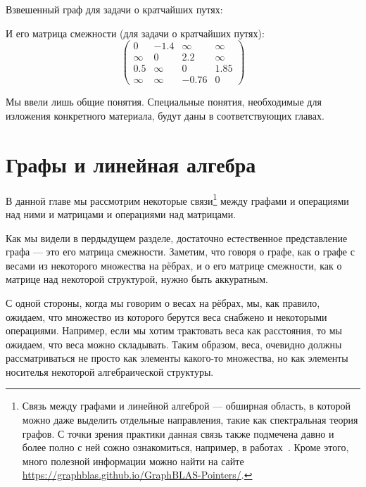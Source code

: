 \begin{example}\label{example:apspGraph}
  Взвешенный граф для задачи о кратчайших путях:
  \begin{center}
    
  \end{center}

  И его матрица смежности (для задачи о кратчайших путях):
  $$
  \begin{pmatrix}
    0 & -1.4 & \infty & \infty \\
    \infty & 0 & 2.2 & \infty \\
    0.5 & \infty & 0 & 1.85 \\
    \infty & \infty & -0.76 & 0
  \end{pmatrix}
  $$
\end{example}

Мы ввели лишь общие понятия.
Специальные понятия, необходимые для изложения конкретного материала, будут даны в соответствующих главах.

\section{Графы и линейная алгебра}

В данной главе мы рассмотрим некоторые связи\footnote{Связь между графами и линейной алгеброй --- обширная область, в которой можно даже выделить отдельные направления, такие как спектральная теория графов. С точки зрения практики данная связь также подмечена давно и более полно с ней сожно ознакомиться, например, в работах~\cite{doi:10.1137/1.9780898719918, Davis2018Algorithm9S}. Кроме этого, много полезной информации можно найти на сайте \url{https://graphblas.github.io/GraphBLAS-Pointers/}.} между графами и операциями над ними и матрицами и операциями над матрицами. 

Как мы видели в пердыдущем разделе, достаточно естественное представление графа --- это его матрица смежности. Заметим, что говоря о графе, как о графе с весами из некоторого множества на рёбрах, и о его матрице смежности, как о матрице над некоторой структурой, нужно быть аккуратным.

С одной стороны, когда мы говорим о весах на рёбрах, мы, как правило, ожидаем, что множество из которого берутся веса снабжено и некоторыми операциями. Например, если мы хотим трактовать веса как расстояния, то мы ожидаем, что веса можно складывать. Таким образом, веса, очевидно должны рассматриваться не просто как элементы какого-то множества, но как элементы носителья некоторой алгебраической структуры. 

